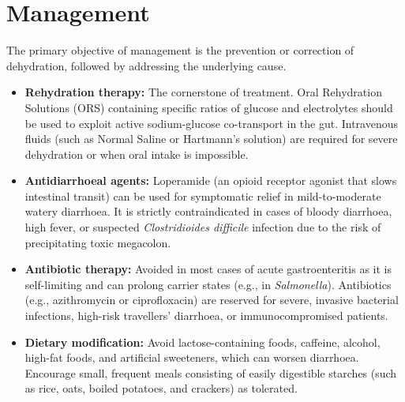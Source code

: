 \section*{Management}
The primary objective of management is the prevention or correction of dehydration, followed by addressing the underlying cause.
\begin{itemize}
    \item \textbf{Rehydration therapy:} The cornerstone of treatment. Oral Rehydration Solutions (ORS) containing specific ratios of glucose and electrolytes should be used to exploit active sodium-glucose co-transport in the gut. Intravenous fluids (such as Normal Saline or Hartmann's solution) are required for severe dehydration or when oral intake is impossible.
    \item \textbf{Antidiarrhoeal agents:} Loperamide (an opioid receptor agonist that slows intestinal transit) can be used for symptomatic relief in mild-to-moderate watery diarrhoea. It is strictly contraindicated in cases of bloody diarrhoea, high fever, or suspected \textit{Clostridioides difficile} infection due to the risk of precipitating toxic megacolon.
    \item \textbf{Antibiotic therapy:} Avoided in most cases of acute gastroenteritis as it is self-limiting and can prolong carrier states (e.g., in \textit{Salmonella}). Antibiotics (e.g., azithromycin or ciprofloxacin) are reserved for severe, invasive bacterial infections, high-risk travellers' diarrhoea, or immunocompromised patients.
    \item \textbf{Dietary modification:} Avoid lactose-containing foods, caffeine, alcohol, high-fat foods, and artificial sweeteners, which can worsen diarrhoea. Encourage small, frequent meals consisting of easily digestible starches (such as rice, oats, boiled potatoes, and crackers) as tolerated.
\end{itemize}

